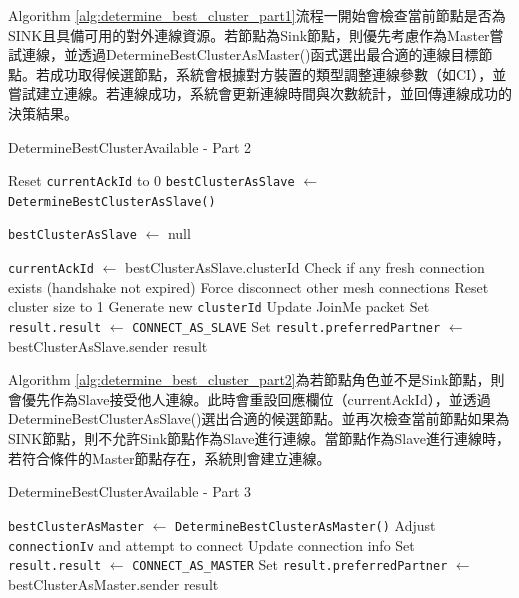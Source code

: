 \begin{ZhChapter}
Algorithm \ref{alg:determine_best_cluster_part1}流程一開始會檢查當前節點是否為SINK且具備可用的對外連線資源。若節點為Sink節點，則優先考慮作為Master嘗試連線，並透過DetermineBestClusterAsMaster()函式選出最合適的連線目標節點。若成功取得候選節點，系統會根據對方裝置的類型調整連線參數（如CI），並嘗試建立連線。若連線成功，系統會更新連線時間與次數統計，並回傳連線成功的決策結果。

\begin{algorithm}[H]
\caption{DetermineBestClusterAvailable - Part 2}
\label{alg:determine_best_cluster_part2}
\begin{algorithmic}[1]
    \State Reset \texttt{currentAckId} to 0
    \State \texttt{bestClusterAsSlave} $\gets$ \texttt{DetermineBestClusterAsSlave()}

        \State \texttt{bestClusterAsSlave} $\gets$ null
    \EndIf

        \State \texttt{currentAckId} $\gets$ bestClusterAsSlave.clusterId
            \State Check if any fresh connection exists (handshake not expired)
                    \State Force disconnect other mesh connections
                    \State Reset cluster size to 1
                    \State Generate new \texttt{clusterId}
                \EndIf
            \EndIf
        \EndIf
        \State Update JoinMe packet
        \State Set \texttt{result.result} $\gets$ \texttt{CONNECT\_AS\_SLAVE}
        \State Set \texttt{result.preferredPartner} $\gets$ bestClusterAsSlave.sender
        \State \Return result
    \EndIf
\end{algorithmic}
\end{algorithm}

Algorithm \ref{alg:determine_best_cluster_part2}為若節點角色並不是Sink節點，則會優先作為Slave接受他人連線。此時會重設回應欄位（currentAckId），並透過DetermineBestClusterAsSlave()選出合適的候選節點。並再次檢查當前節點如果為SINK節點，則不允許Sink節點作為Slave進行連線。當節點作為Slave進行連線時，若符合條件的Master節點存在，系統則會建立連線。

\begin{algorithm}[H]
\caption{DetermineBestClusterAvailable - Part 3}
\label{alg:determine_best_cluster_part3}
\begin{algorithmic}[1]
\State \texttt{bestClusterAsMaster} $\gets$ \texttt{DetermineBestClusterAsMaster()}
    \State Adjust \texttt{connectionIv} and attempt to connect
        \State Update connection info
    \EndIf
    \State Set \texttt{result.result} $\gets$ \texttt{CONNECT\_AS\_MASTER}
    \State Set \texttt{result.preferredPartner} $\gets$ bestClusterAsMaster.sender
    \State \Return result
\EndIf


\end{algorithmic}
\end{algorithm}
\end{ZhChapter}
